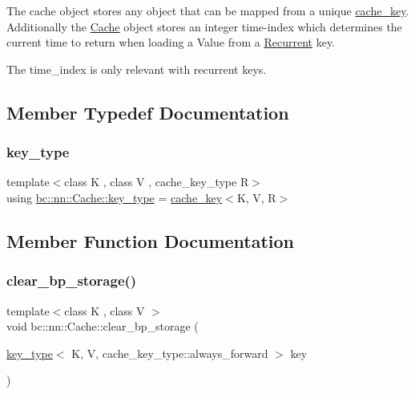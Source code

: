 The cache object stores any object that can be mapped from a unique \hyperlink{structbc_1_1nn_1_1cache__key}{cache\+\_\+key}. Additionally the \hyperlink{structbc_1_1nn_1_1Cache}{Cache} object stores an integer time-\/index which determines the current \textquotesingle{}time\textquotesingle{} to return when loading a Value from a \hyperlink{structbc_1_1nn_1_1Recurrent}{Recurrent} key.

The time\+\_\+index is only relevant with recurrent keys. 

\subsection{Member Typedef Documentation}
\mbox{\label{structbc_1_1nn_1_1Cache_aedd77c5710dcb5f9edd8ecb3c3041048}} 
\subsubsection{\texorpdfstring{key\+\_\+type}{key\_type}}
{\footnotesize\ttfamily template$<$class K , class V , cache\+\_\+key\+\_\+type R$>$ \\
using \hyperlink{structbc_1_1nn_1_1Cache_aedd77c5710dcb5f9edd8ecb3c3041048}{bc\+::nn\+::\+Cache\+::key\+\_\+type} =  \hyperlink{structbc_1_1nn_1_1cache__key}{cache\+\_\+key}$<$K, V, R$>$}



\subsection{Member Function Documentation}
\mbox{\label{structbc_1_1nn_1_1Cache_a94b464a2aadc62eacc8e3c38898d6f41}} 
\subsubsection{\texorpdfstring{clear\+\_\+bp\+\_\+storage()}{clear\_bp\_storage()}\hspace{0.1cm}{\footnotesize\ttfamily [1/3]}}
{\footnotesize\ttfamily template$<$class K , class V $>$ \\
void bc\+::nn\+::\+Cache\+::clear\+\_\+bp\+\_\+storage (\begin{DoxyParamCaption}\item[{\hyperlink{structbc_1_1nn_1_1Cache_aedd77c5710dcb5f9edd8ecb3c3041048}{key\+\_\+type}$<$ K, V, cache\+\_\+key\+\_\+type\+::always\+\_\+forward $>$}]{key }\end{DoxyParamCaption})\hspace{0.3cm}{\ttfamily [inline]}}

